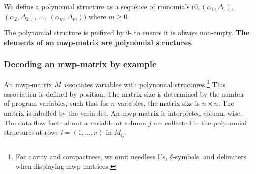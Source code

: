 \begin{definition}
    We define a polynomial structure as a sequence of monomials
    \(\big(0,(\alpha_1,\Delta_1)\), \((\alpha_2,\Delta_2)\), \(\dots\), \((\alpha_m, \Delta_m)\big)\) where \(m \geq 0\).
\end{definition}

\noindent The polynomial structure is prefixed by \(0\)- to ensure it is always non-empty.
\textbf{The elements of an mwp-matrix are polynomial structures.}

\subsubsection{Decoding an mwp-matrix by example}
\label{subsec:read-mat}

An mwp-matrix \(M\) associates variables with polynomial structures.\footnote{
    For clarity and compactness, we omit needless \(0\)'s, \(\delta\)-symbols, and delimiters when displaying mwp-matrices.}
This association is defined by position.
The matrix size is determined by the number of program variables, such that for \(n\) variables, the matrix size is \(n \times n\).
The matrix is labelled by the variables. %
An mwp-matrix is interpreted {column-wise}.
The data-flow facts about a variable at column \(j\) are collected in the polynomial structures at rows \(i=(1, \ldots, n)\) in \(M_{ij}\).

